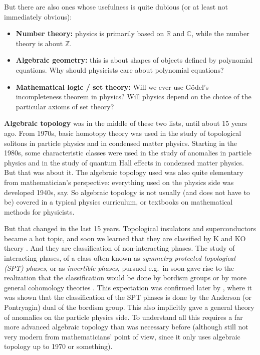 \documentclass[12pt]{article}
\numberwithin{equation}{section}
\def\bC{\mathbb{C}}
\def\bR{\mathbb{R}}
\def\bZ{\mathbb{Z}}
\begin{document}
But there are also ones whose usefulness is quite dubious (or at least not immediately obvious):
\begin{itemize}
  \item \textbf{Number theory:} physics is primarily based on $\bR$ and $\bC$, 
  while the number theory is about $\bZ$.
  \item \textbf{Algebraic geometry:} this is about shapes of objects defined by polynomial equations. 
  Why should physicists care about polynomial equations?
  \item \textbf{Mathematical logic / set theory:} Will we ever use G\"odel's incompleteness theorem in physics?
  Will physics depend on the choice of the particular axioms of set theory?
\end{itemize}

\textbf{Algebraic topology} was in the middle of these two lists, until about 15 years ago.
From 1970s, basic homotopy theory was used in the study of topological solitons 
in particle physics and in condensed matter physics.
Starting in the 1980s, 
some characteristic classes were used in the study of anomalies in particle physics
and in the study of quantum Hall effects in condensed matter physics.
But that was about it.
The algebraic topology used was also quite elementary from mathematician's perspective:
everything used on the physics side was developed 1940s, say.
So  algebraic topology is not usually (and does not have to be) covered in a typical physics curriculum,
or textbooks on mathematical methods for physicists.

But that changed in the last 15 years. 
Topological insulators and superconductors became a hot topic,
and soon we learned that they are classified by K and KO theory \cite{Schnyder:2008tya,Kitaev:2009mg,Ryu:2010zza}.
And they are classification of non-interacting phases.
The study of interacting phases, of a class often known as \emph{symmetry protected topological (SPT) phases},
or as \emph{invertible phases}, 
pursued e.g.~in \cite{Fidkowski:2009dba,Chen:2011pg,Gu:2012ib,Metlitski:2014xqa} 
soon gave rise to the realization that the classification would be done by bordism groups \cite{Kapustin:2014dxa}
or by more general cohomology theories \cite{KitaevCollapse}.
This expectation was confirmed later by \cite{Freed:2016rqq,Yonekura:2018ufj},
where it was shown that the classification of the SPT phases is done by 
the Anderson (or Pontryagin) dual of the bordism group.
This also implicitly gave a general theory of anomalies on the particle physics side.
To understand all this requires a far more advanced algebraic topology than was necessary before
(although still not very modern from mathematicians' point of view, 
since it only uses algebraic topology up to 1970 or something).
\end{document}
